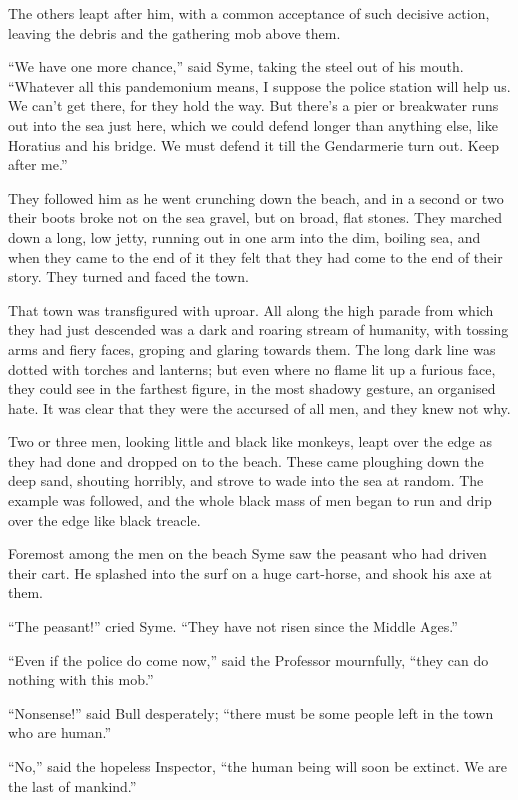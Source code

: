 \documentclass{book}
\begin{document}
The others leapt after him, with a common acceptance of such decisive action, leaving the debris and the gathering mob above them.

“We have one more chance,” said Syme, taking the steel out of his mouth. “Whatever all this pandemonium means, I suppose the police station will help us. We can’t get there, for they hold the way. But there’s a pier or breakwater runs out into the sea just here, which we could defend longer than anything else, like Horatius and his bridge. We must defend it till the Gendarmerie turn out. Keep after me.”

They followed him as he went crunching down the beach, and in a second or two their boots broke not on the sea gravel, but on broad, flat stones. They marched down a long, low jetty, running out in one arm into the dim, boiling sea, and when they came to the end of it they felt that they had come to the end of their story. They turned and faced the town.

That town was transfigured with uproar. All along the high parade from which they had just descended was a dark and roaring stream of humanity, with tossing arms and fiery faces, groping and glaring towards them. The long dark line was dotted with torches and lanterns; but even where no flame lit up a furious face, they could see in the farthest figure, in the most shadowy gesture, an organised hate. It was clear that they were the accursed of all men, and they knew not why.

Two or three men, looking little and black like monkeys, leapt over the edge as they had done and dropped on to the beach. These came ploughing down the deep sand, shouting horribly, and strove to wade into the sea at random. The example was followed, and the whole black mass of men began to run and drip over the edge like black treacle.

Foremost among the men on the beach Syme saw the peasant who had driven their cart. He splashed into the surf on a huge cart-horse, and shook his axe at them.

“The peasant!” cried Syme. “They have not risen since the Middle Ages.”

“Even if the police do come now,” said the Professor mournfully, “they can do nothing with this mob.”

“Nonsense!” said Bull desperately; “there must be some people left in the town who are human.”

“No,” said the hopeless Inspector, “the human being will soon be extinct. We are the last of mankind.”
\end{document}
